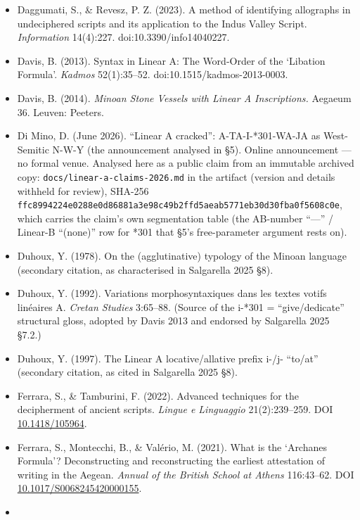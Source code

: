 \documentclass[
  10pt,
]{article}
\begin{document}
\begin{itemize}
{  International Database Applications \& Engineering Symposium (IDEAS)}.
\item
  Daggumati, S., \& Revesz, P. Z. (2023). A method of identifying
  allographs in undeciphered scripts and its application to the Indus
  Valley Script. \emph{Information} 14(4):227. doi:10.3390/info14040227.
\item
  Davis, B. (2013). Syntax in Linear A: The Word-Order of the `Libation
  Formula'. \emph{Kadmos} 52(1):35--52. doi:10.1515/kadmos-2013-0003.
\item
  Davis, B. (2014). \emph{Minoan Stone Vessels with Linear A
  Inscriptions.} Aegaeum 36. Leuven: Peeters.
\item
  Di Mino, D. (June 2026). ``Linear A cracked'': A-TA-I-*301-WA-JA as
  West-Semitic N-W-Y (the announcement analysed in §5). Online
  announcement --- no formal venue. Analysed here as a public claim from
  an immutable archived copy: \texttt{docs/linear-a-claims-2026.md} in
  the artifact (version and details withheld for review), SHA-256
  \texttt{ffc8994224e0288e0d86881a3e98c49b2ffd5aeab5771eb30d30fba0f5608c0e},
  which carries the claim's own segmentation table (the AB-number
  ``---'' / Linear-B ``(none)'' row for *301 that §5's free-parameter
  argument rests on).
\item
  Duhoux, Y. (1978). On the (agglutinative) typology of the Minoan
  language (secondary citation, as characterised in Salgarella 2025 §8).
\item
  Duhoux, Y. (1992). Variations morphosyntaxiques dans les textes votifs
  linéaires A. \emph{Cretan Studies} 3:65--88. (Source of the i-*301 =
  ``give/dedicate'' structural gloss, adopted by Davis 2013 and endorsed
  by Salgarella 2025 §7.2.)
\item
  Duhoux, Y. (1997). The Linear A locative/allative prefix i-/j-
  ``to/at'' (secondary citation, as cited in Salgarella 2025 §8).
\item
  Ferrara, S., \& Tamburini, F. (2022). Advanced techniques for the
  decipherment of ancient scripts. \emph{Lingue e Linguaggio}
  21(2):239--259. DOI
  \href{https://doi.org/10.1418/105964}{10.1418/105964}.
\item
  Ferrara, S., Montecchi, B., \& Valério, M. (2021). What is the
  `Archanes Formula'? Deconstructing and reconstructing the earliest
  attestation of writing in the Aegean. \emph{Annual of the British
  School at Athens} 116:43--62. DOI
  \href{https://doi.org/10.1017/S0068245420000155}{10.1017/S0068245420000155}.
\item

\end{itemize}
\end{document}
